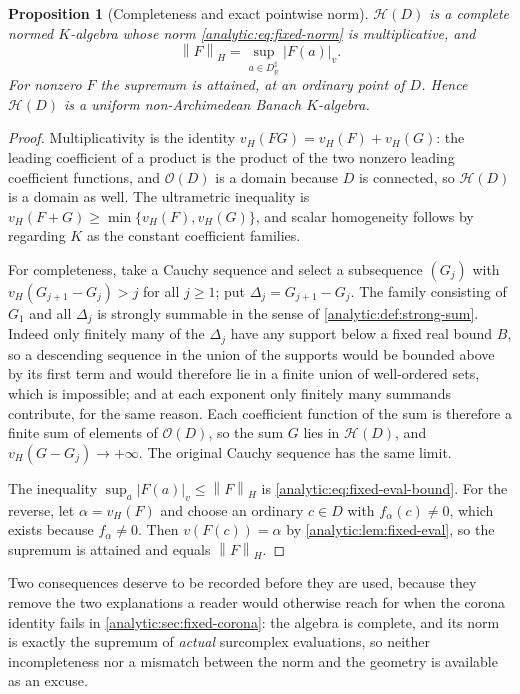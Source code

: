 \documentclass[11pt,letterpaper]{article}
\newtheorem{proposition}[theorem]{Proposition}
\theoremstyle{definition}
\theoremstyle{remark}
\newcommand{\R}{\mathbb R}
\newcommand{\HH}{\mathcal H}
\newcommand{\OO}{\mathcal O}
\newcommand{\norm}[1]{\left\lVert#1\right\rVert}
\newcommand{\vH}{v_{\!H}}
\numberwithin{equation}{section}
\begin{document}
\begin{proposition}[Completeness and exact pointwise norm]
\label{analytic:prop:fixed-banach}
$\HH(D)$ is a complete normed $K$-algebra whose norm
\eqref{analytic:eq:fixed-norm} is multiplicative, and
\begin{equation}\label{analytic:eq:fixed-supnorm}
 \norm{F}_H=\sup_{a\in D^\sharp_\R}|F(a)|_v .
\end{equation}
For nonzero $F$ the supremum is attained, at an ordinary point of $D$.
Hence $\HH(D)$ is a uniform non-Archimedean Banach $K$-algebra.
\end{proposition}
\begin{proof}
Multiplicativity is the identity $\vH(FG)=\vH(F)+\vH(G)$: the leading
coefficient of a product is the product of the two nonzero leading
coefficient functions, and $\OO(D)$ is a domain because $D$ is connected,
so $\HH(D)$ is a domain as well. The ultrametric inequality is
$\vH(F+G)\ge\min\{\vH(F),\vH(G)\}$, and scalar homogeneity follows by
regarding $K$ as the constant coefficient families.

For completeness, take a Cauchy sequence and select a subsequence $(G_j)$
with $\vH(G_{j+1}-G_j)>j$ for all $j\ge1$; put $\Delta_j=G_{j+1}-G_j$. The
family consisting of $G_1$ and all $\Delta_j$ is strongly summable in the
sense of \cref{analytic:def:strong-sum}. Indeed only finitely many of the
$\Delta_j$ have any support below a fixed real bound $B$, so a descending
sequence in the union of the supports would be bounded above by its first
term and would therefore lie in a finite union of well-ordered sets, which
is impossible; and at each exponent only finitely many summands contribute,
for the same reason. Each coefficient function of the sum is therefore a
finite sum of elements of $\OO(D)$, so the sum $G$ lies in $\HH(D)$, and
$\vH(G-G_j)\to+\infty$. The original Cauchy sequence has the same limit.

The inequality $\sup_a|F(a)|_v\le\norm F_H$ is
\eqref{analytic:eq:fixed-eval-bound}. For the reverse, let
$\alpha=\vH(F)$ and choose an ordinary $c\in D$ with $f_\alpha(c)\ne0$,
which exists because $f_\alpha\ne0$. Then $v(F(c))=\alpha$ by
\cref{analytic:lem:fixed-eval}, so the supremum is attained and equals
$\norm F_H$.
\end{proof}

Two consequences deserve to be recorded before they are used, because they
remove the two explanations a reader would otherwise reach for when the
corona identity fails in \cref{analytic:sec:fixed-corona}: the algebra is
complete, and its norm is exactly the supremum of \emph{actual} surcomplex
evaluations, so neither incompleteness nor a mismatch between the norm and
the geometry is available as an excuse.
\end{document}
